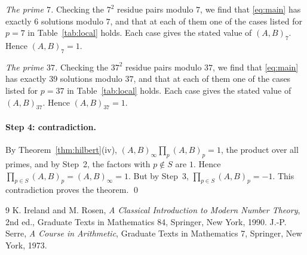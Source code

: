\documentclass[11pt]{article}
\begin{document}
\emph{The prime $7$.} Checking the $7^2$ residue pairs modulo $7$, we find that \eqref{eq:main} has exactly 6 solutions modulo $7$, and that at each of them one of the cases listed for $p=7$ in Table~\ref{tab:local} holds. Each case gives the stated value of $(A,B)_{7}$. Hence $(A,B)_{7}=1$.

\emph{The prime $37$.} Checking the $37^2$ residue pairs modulo $37$, we find that \eqref{eq:main} has exactly 39 solutions modulo $37$, and that at each of them one of the cases listed for $p=37$ in Table~\ref{tab:local} holds. Each case gives the stated value of $(A,B)_{37}$. Hence $(A,B)_{37}=1$.

\paragraph{Step 4: contradiction.} By Theorem~\ref{thm:hilbert}(iv), $(A,B)_\infty\prod_p(A,B)_p=1$, the product over all primes, and by Step~2, the factors with $p\notin S$ are $1$. Hence $\prod_{p\in S}(A,B)_p=(A,B)_\infty=1$. But by Step~3, $\prod_{p\in S}(A,B)_p=-1$. This contradiction proves the theorem.
\qed

\begin{thebibliography}{9}
 K. Ireland and M. Rosen, \emph{A Classical Introduction to Modern Number Theory}, 2nd ed., Graduate Texts in Mathematics 84, Springer, New York, 1990.
 J.-P. Serre, \emph{A Course in Arithmetic}, Graduate Texts in Mathematics 7, Springer, New York, 1973.
\end{thebibliography}
\end{document}
